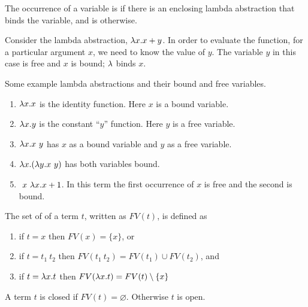 \begin{flex}
\begin{definition}
\label{def:lcs::bound-and-free}
The occurrence of a variable is  if there is an enclosing
lambda abstraction that binds the variable, and is 
otherwise.
\end{definition}

\begin{example}
Consider the lambda abstraction, $\lambda x. x + y$.  In order to evaluate
the function, for a particular argument $x$, we need to know
the value of $y$.  The variable $y$ in this case is free and $x$
is bound; $\lambda$ binds $x$.  
\end{example}


\begin{example} 
  Some example lambda abstractions and their bound and free variables.
\begin{enumerate}
\item $\lambda x. x$ is the identity function. Here $x$ is a bound variable.
\item $\lambda x. y$ is the constant ``$y$'' function. Here $y$ is a free variable.
\item $\lambda x. x~y$ has $x$ as a bound variable and $y$ as a free variable.
\item $\lambda x. (\lambda y. x~y)$ has both variables bound.
\item $~x~\lambda x. x + 1$.  In this term the first occurrence of $x$ is
  free and the second is bound.
\end{enumerate}
\end{example}
\end{flex}

\begin{definition}
\label{def:lcs::fv}
The set of  of a term $t$, written as $FV(t)$,
is defined as 
\begin{enumerate}
\item if $t = x$ then $FV(x) = \{ x \}$, or
\item if $t = t_1~t_2$ then $FV(t_1~t_2)=FV(t_1) \cup FV(t_2)$, and
\item if $t = \lambda x. t$ then $FV(\lambda x.t)=FV(t) \setminus \{x\}$
\end{enumerate}
\end{definition}

\begin{definition}
\label{def:lcs::open-closed}
A term $t$ is closed if $FV(t) = \varnothing$. Otherwise $t$ is open. 
\end{definition}


